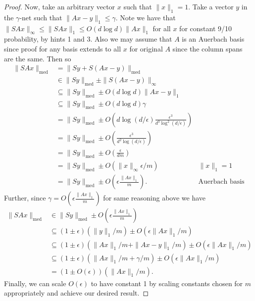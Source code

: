 \documentclass[11pt]{article}
\begin{document}
\begin{proof}
Now, take an arbitrary vector $x$ such that $\|x\|_1 = 1$. Take a vector $y$ in the $\gamma$-net such that $\|Ax - y\|_1 \le \gamma$. Note we have that $\|SAx\|_\infty \le \|SAx\|_1 \le O(d\log d)\|Ax\|_1$ for all $x$ for constant 9/10 probability, by hints 1 and 3. Also we may assume that $A$ is an Auerbach basis since proof for any basis extends to all $x$ for original $A$ since the column spans are the same. Then so
\begin{align*}
  \|SAx\|_{\text{med}} &= \|Sy + S(Ax - y)\|_{\text{med}}\\
  &\in \|Sy\|_{\text{med}} \pm \|S(Ax - y)\|_\infty\\
  &\subseteq \|Sy\|_{\text{med}} \pm O(d\log d)\|Ax - y\|_1\\
  &\subseteq \|Sy\|_{\text{med}} \pm O(d\log d) \gamma\\
  &= \|Sy\|_{\text{med}} \pm O\left(d\log(d/\epsilon) \frac{\epsilon^3}{d^3 \log^2(d/\epsilon)}\right)\\
  &= \|Sy\|_{\text{med}} \pm O\left(\frac{\epsilon^3}{d^2 \log(d/\epsilon)}\right)\\
  &= \|Sy\|_{\text{med}} \pm O\left(\frac{\epsilon}{dm}\right)\\
  &= \|Sy\|_{\text{med}} \pm O(\|x\|_\infty \epsilon/m) &\|x\|_1 = 1\\
  &= \|Sy\|_{\text{med}} \pm O\left(\epsilon\frac{\|Ax\|_1}{m}\right). &\text{Auerbach basis}
\end{align*}
Further, since $\gamma = O\left(\epsilon \frac{\|Ax\|_1}{m}\right)$ for same reasoning above we have
\begin{align*}
  \|SAx\|_{\text{med}} &\in \|Sy\|_{\text{med}} \pm O\left(\epsilon\frac{\|Ax\|_1}{m}\right)\\
  &\subseteq (1 \pm \epsilon)(\|y\|_1/m) \pm O(\epsilon\|Ax\|_1/m)\\
  &\subseteq (1 \pm \epsilon)(\|Ax\|_1/m + \|Ax - y\|_1/m) \pm O(\epsilon\|Ax\|_1/m)\\
  &\subseteq (1 \pm \epsilon)(\|Ax\|_1/m + \gamma/m) \pm O(\epsilon\|Ax\|_1/m)\\
  &= (1 \pm O(\epsilon))(\|Ax\|_1/m).
\end{align*}
Finally, we can scale $O(\epsilon)$ to have constant 1 by scaling constants chosen for $m$ appropriately and achieve our desired result.
\end{proof}
\end{document}
